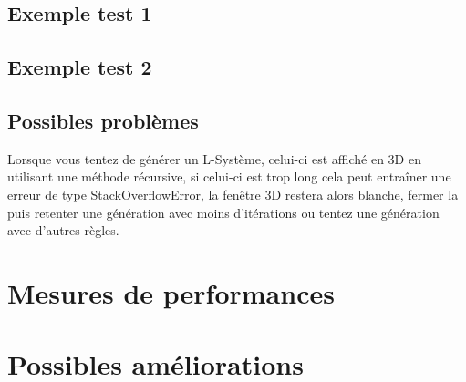 \subsection{Exemple test 1}

\subsection{Exemple test 2}

\subsection{Possibles problèmes}

Lorsque vous tentez de générer un L-Système, celui-ci est affiché en 3D en utilisant une méthode récursive, si celui-ci est trop long cela peut entraîner une erreur de type StackOverflowError, la fenêtre 3D restera alors blanche, fermer la puis retenter une génération avec moins d'itérations ou tentez une génération avec d'autres règles.

\section{Mesures de performances}

\section{Possibles améliorations}


